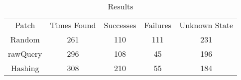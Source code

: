 \begin{table}[H]
	\centering
	\begin{tabular}{|c|c|c|c|c|}
		\hline
		Patch & Times Found & Successes & Failures & Unknown State\\
		Random & 261 & 110 & 111 & 231\\
		\hline
		rawQuery & 296 & 108 & 45 & 196\\
		\hline
		Hashing & 308 & 210 & 55 & 184\\
		\hline
	\end{tabular}
	\caption{Results}
	\label{tab:evaluation}
\end{table}
\newpage
